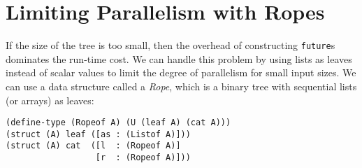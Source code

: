 \documentclass{article}
\begin{document}
\section{Limiting Parallelism with Ropes}

If the size of the tree is too small, then the overhead of constructing \lstinline{future}s dominates the run-time cost. We can handle this problem by using lists as leaves instead of scalar values to limit the degree of parallelism for small input sizes. We can use a data structure called a \emph{Rope}, which is a binary tree with sequential lists (or arrays) as leaves:

\begin{lstlisting}
(define-type (Ropeof A) (U (leaf A) (cat A)))
(struct (A) leaf ([as : (Listof A)]))
(struct (A) cat  ([l  : (Ropeof A)]
                  [r  : (Ropeof A)]))
\end{lstlisting}
\end{document}
